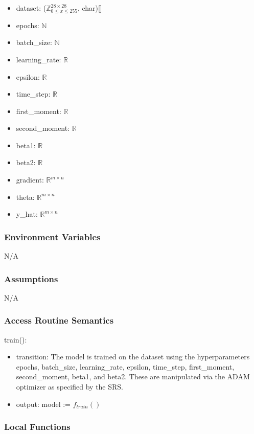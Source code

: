 \documentclass[12pt, titlepage]{article}
\begin{document}
\begin{itemize}
  \item dataset: ($\mathbb{Z}^{28 \times 28}_{0 \le x \le 255}$, char)[]
  \item epochs: $\mathbb{N}$
  \item batch\_size: $\mathbb{N}$
  \item learning\_rate: $\mathbb{R}$
  \item epsilon: $\mathbb{R}$
  \item time\_step: $\mathbb{R}$
  \item first\_moment: $\mathbb{R}$
  \item second\_moment: $\mathbb{R}$
  \item beta1: $\mathbb{R}$
  \item beta2: $\mathbb{R}$
  \item gradient: $\mathbb{R}^{m \times n}$
  \item theta: $\mathbb{R}^{m \times n}$
  \item y\_hat: $\mathbb{R}^{m \times n}$
\end{itemize}

\subsubsection{Environment Variables}

N/A

\subsubsection{Assumptions}

N/A

\subsubsection{Access Routine Semantics}

\noindent train():
\begin{itemize}
\item transition: The model is trained on the dataset using the hyperparameters
epochs, batch\_size, learning\_rate, epsilon, time\_step, first\_moment,
second\_moment, beta1, and beta2. These are manipulated via the ADAM optimizer
as specified by the SRS.
\item output: model := $f_{train}()$
\end{itemize}

\subsubsection{Local Functions}
\end{document}
